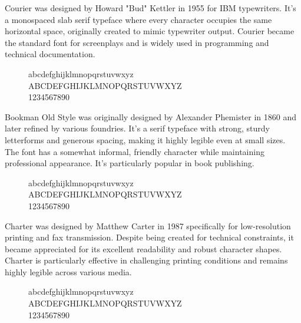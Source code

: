   \begin{example}[Courier]
    Courier was designed by Howard "Bud" Kettler in 1955 for IBM typewriters. It's a monospaced slab serif typeface where every character occupies the same horizontal space, originally created to mimic typewriter output. Courier became the standard font for screenplays and is widely used in programming and technical documentation. 
    
    \begin{figure}[H]
      \selectfont
      \huge
      \raggedright
      abcdefghijklmnopqrstuvwxyz \\
      ABCDEFGHIJKLMNOPQRSTUVWXYZ \\
      1234567890
    \end{figure}
  \end{example}

  \begin{example}[Bookman]
    Bookman Old Style was originally designed by Alexander Phemister in 1860 and later refined by various foundries. It's a serif typeface with strong, sturdy letterforms and generous spacing, making it highly legible even at small sizes. The font has a somewhat informal, friendly character while maintaining professional appearance. It's particularly popular in book publishing. 
    
    \begin{figure}[H]
      \selectfont
      \huge
      \raggedright
      abcdefghijklmnopqrstuvwxyz \\
      ABCDEFGHIJKLMNOPQRSTUVWXYZ \\
      1234567890
    \end{figure}
  \end{example}

  \begin{example}[Charter]
    Charter was designed by Matthew Carter in 1987 specifically for low-resolution printing and fax transmission. Despite being created for technical constraints, it became appreciated for its excellent readability and robust character shapes. Charter is particularly effective in challenging printing conditions and remains highly legible across various media. 
    
    \begin{figure}[H]
      \selectfont
      \huge
      \raggedright
      abcdefghijklmnopqrstuvwxyz \\
      ABCDEFGHIJKLMNOPQRSTUVWXYZ \\
      1234567890
    \end{figure}
  \end{example}
  
